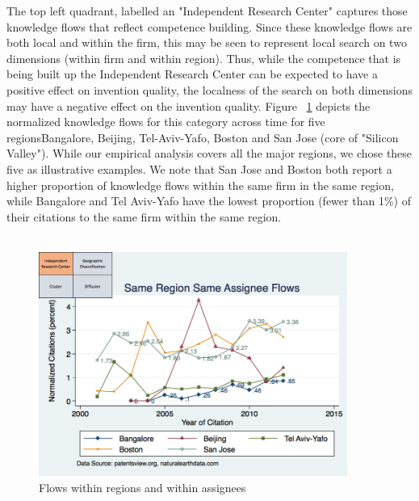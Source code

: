 \documentclass[10pt,letterpaper]{article}
\begin{document}
The top left quadrant, labelled an "Independent Research Center" captures those knowledge flows that reflect competence building. Since these knowledge flows  are both local and within the firm, this may be seen to represent local search on two dimensions (within firm and within region).  Thus, while the competence that is being built up the Independent Research Center can be expected to have a positive effect on invention quality, the localness of the search on both dimensions may have a negative effect on the invention quality. Figure ~\ref{fig:SMSSameRegionSameAssigneeFlows} depicts the normalized knowledge flows for this category across time for five regionsBangalore, Beijing, Tel-Aviv-Yafo, Boston and San Jose (core of "Silicon Valley"). While our empirical analysis covers all the major regions, we chose these five as illustrative examples. We note that San Jose and Boston both report a higher proportion of knowledge flows within the same firm in the same region, while Bangalore and Tel Aviv-Yafo have the lowest proportion (fewer than 1\%) of their citations to the same firm within the same region.
\\\\
\begin{figure}[h!]
\begin{centering}
  \includegraphics[width=0.90\textwidth]{SMSSameRegionSameAssigneeFlows}
  \caption{Flows within regions and within assignees}
  \label{fig:SMSSameRegionSameAssigneeFlows}
\end{centering}
\end{figure}
\end{document}
